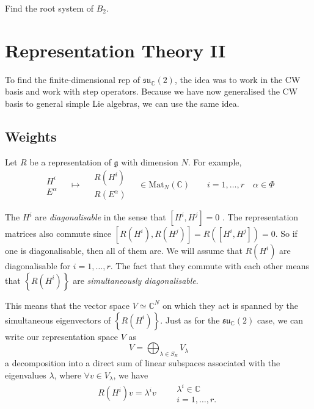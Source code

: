 \begin{exercise}
  Find the root system of $B_2$.
\end{exercise}

\chapter{Representation Theory II}%
\label{cha:representation_theory_ii}

To find the finite-dimensional rep of $\mathfrak{su}_{\mathbb{C}}(2)$, the idea was to work in the CW basis and work with step operators.
Because we have now generalised the CW basis to general simple Lie algebras, we can use the same idea.

\section{Weights}%
\label{sec:weights}

Let $R$ be a representation of $\mathfrak{g}$ with dimension $N$.
For example, 
\begin{equation}
  \begin{gathered}
    H^i \\
    E^{\alpha}
  \end{gathered}
  \quad \mapsto \quad
  \begin{gathered}
    R(H^i) \\
    R(E^\alpha)
  \end{gathered}
  \quad \in \text{Mat}_N(\mathbb{C})
  \qquad i = 1, \dots, r \quad \alpha \in \Phi
\end{equation}

The $H^i$ are  \emph{diagonalisable} in the sense that $[H^i, H^{j}] = 0$ . The representation matrices also commute since $ [R(H^{i}), R(H^{j})] = R([H^{i}, H^{j}]) = 0$. So if one is diagonalisable, then all of them are.
We will assume that $R(H^i)$  are diagonalisable for $i = 1, \dots, r$.
The fact that they commute with each other means that $\left\{ R(H^{i}) \right\}$ are \emph{simultaneously diagonalisable}.

This means that the vector space $V \simeq \mathbb{C}^N$ on which they act is spanned by the simultaneous eigenvectors of $\left\{ R(H^i) \right\}$.
Just as for the  $\mathfrak{su}_{\mathbb{C}}(2)$ case, we can write our representation space $V$ as
 \begin{equation}
  V = \bigoplus_{\lambda \in S_R} V_{\lambda}
\end{equation}
a decomposition into a direct sum of linear subspaces associated with the eigenvalues $\lambda$, where $\forall v \in V_\lambda$, we have
\begin{equation}
  R(H^{i}) v = \lambda^{i} v \qquad 
  \begin{gathered}
    \lambda^{i} \in \mathbb{C} \\
    i = 1, \dots, r.
  \end{gathered}
\end{equation}

